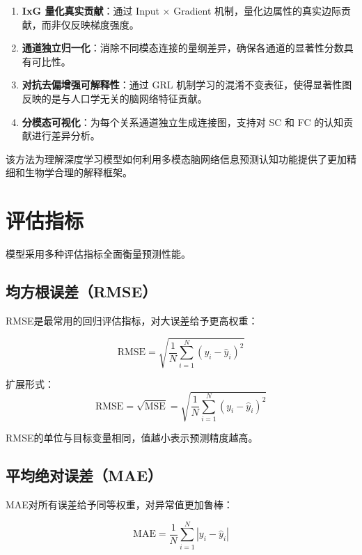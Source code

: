 \documentclass[UTF8, a4paper, 12pt]{article}
\begin{document}
\begin{enumerate}
    \item \textbf{IxG 量化真实贡献}：通过 Input × Gradient 机制，量化边属性的真实边际贡献，而非仅反映梯度强度。

    \item \textbf{通道独立归一化}：消除不同模态连接的量纲差异，确保各通道的显著性分数具有可比性。

    \item \textbf{对抗去偏增强可解释性}：通过 GRL 机制学习的混淆不变表征，使得显著性图反映的是与人口学无关的脑网络特征贡献。

    \item \textbf{分模态可视化}：为每个关系通道独立生成连接图，支持对 SC 和 FC 的认知贡献进行差异分析。
\end{enumerate}

该方法为理解深度学习模型如何利用多模态脑网络信息预测认知功能提供了更加精细和生物学合理的解释框架。

\newpage

\section{评估指标}

模型采用多种评估指标全面衡量预测性能。

\subsection{均方根误差（RMSE）}

RMSE是最常用的回归评估指标，对大误差给予更高权重：

\begin{equation}
\text{RMSE} = \sqrt{ \frac{1}{N} \sum_{i=1}^{N} (y_i - \hat{y}_i)^2 }
\end{equation}

扩展形式：
\begin{equation}
\text{RMSE} = \sqrt{ \text{MSE} } = \sqrt{ \frac{1}{N} \sum_{i=1}^{N} (y_i - \hat{y}_i)^2 }
\end{equation}

RMSE的单位与目标变量相同，值越小表示预测精度越高。

\subsection{平均绝对误差（MAE）}

MAE对所有误差给予同等权重，对异常值更加鲁棒：

\begin{equation}
\text{MAE} = \frac{1}{N} \sum_{i=1}^{N} | y_i - \hat{y}_i |
\end{equation}
\end{document}
